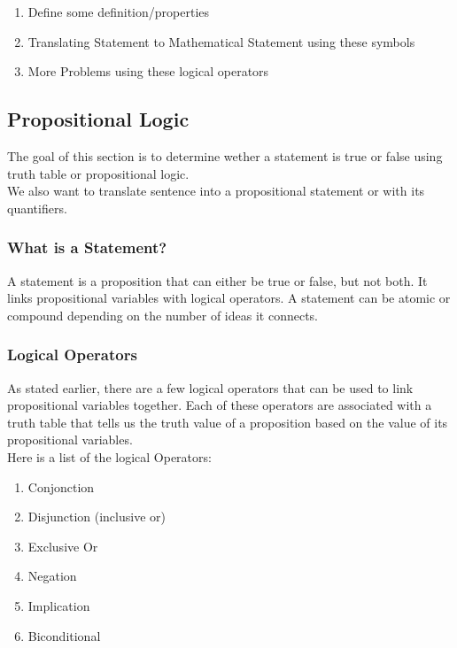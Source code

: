 \documentclass{article}
\begin{document}
    \begin{enumerate}
	\item Define some definition/properties
	\item Translating Statement to Mathematical Statement using these symbols
	\item More Problems using these logical operators
    \end{enumerate}

\subsection{Propositional Logic}

The goal of this section is to determine wether a statement is true or false
using truth table or propositional logic.\\

We also want to translate sentence into a propositional statement or with its
quantifiers.

\subsubsection{What is a Statement?}

A statement is a proposition that can either be true or false, but not both.
It links propositional variables with logical operators. A statement can be
atomic or compound depending on the number of ideas it connects.

\subsubsection{Logical Operators}

As stated earlier, there are a few logical operators that can be used to link
propositional variables together. Each of these operators are associated with
a truth table that tells us the truth value of a proposition based on the value
of its propositional variables.\\

Here is a list of the logical Operators:

\begin{enumerate}
    \item Conjonction
    \item Disjunction (inclusive or)
    \item Exclusive Or
    \item Negation
    \item Implication
    \item Biconditional
\end{enumerate}
\end{document}
